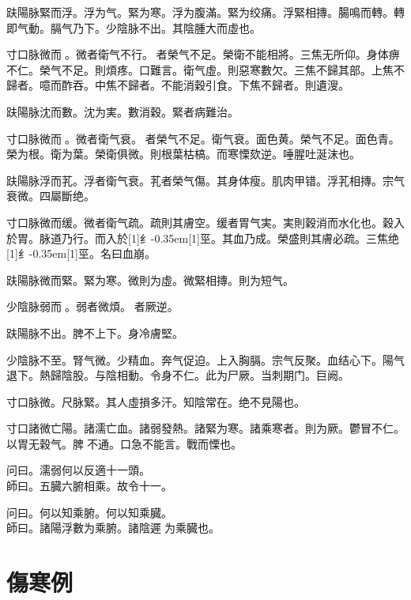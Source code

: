 \documentclass[11pt,oneside,b5paper]{ctexbook}
\begin{document}
\begin{flushleft}
趺陽脉緊而浮。浮为气。緊为寒。浮为腹滿。緊为绞痛。浮緊相摶。腸鳴而轉。轉即气動。膈气乃下。少陰脉不出。其陰腫大而虛也。

寸口脉微而{𬈧}。微者衛气不行。{𬈧}者榮气不足。榮衛不能相將。三焦无所仰。身体痹不仁。榮气不足。則煩疼。口難言。衛气虛。則惡寒數欠。三焦不歸其部。上焦不歸者。噫而酢吞。中焦不歸者。不能消穀引食。下焦不歸者。則遺溲。

趺陽脉沈而數。沈为実。數消穀。緊者病難治。

寸口脉微而{𬈧}。微者衛气衰。{𬈧}者榮气不足。衛气衰。面色黄。榮气不足。面色青。榮为根。衛为葉。榮衛俱微。則根葉枯槁。而寒慄欬逆。唾腥吐涎沫也。

趺陽脉浮而芤。浮者衛气衰。芤者榮气傷。其身体瘦。肌肉甲错。浮芤相摶。宗气衰微。四屬斷绝。

寸口脉微而缓。微者衛气疏。疏則其膚空。缓者胃气実。実則穀消而水化也。穀入於胃。脉道乃行。而入於{\hbox{\scalebox{0.68}[1]{纟}\kern-0.35em\scalebox{0.64}[1]{巠}}}。其血乃成。榮盛則其膚必疏。三焦绝{\hbox{\scalebox{0.68}[1]{纟}\kern-0.35em\scalebox{0.64}[1]{巠}}}。名曰血崩。

趺陽脉微而緊。緊为寒。微則为虛。微緊相摶。則为短气。

少陰脉弱而{𬈧}。弱者微煩。{𬈧}者厥逆。

趺陽脉不出。脾不上下。身冷膚堅。

少陰脉不至。腎气微。少精血。奔气促迫。上入胸膈。宗气反聚。血结心下。陽气退下。熱歸陰股。与陰相動。令身不仁。此为尸厥。当刺期门。巨阙。

寸口脉微。尺脉緊。其人虛損多汗。知陰常在。绝不見陽也。

寸口諸微亡陽。諸濡亡血。諸弱發熱。諸緊为寒。諸乘寒者。則为厥。鬱冒不仁。以胃无穀气。脾{𬈧}不通。口急不能言。戰而慄也。

问曰。濡弱何以反適十一頭。\\
師曰。五臓六腑相乘。故令十一。

问曰。何以知乘腑。何以知乘臓。\\
師曰。諸陽浮數为乘腑。諸陰遲{𬈧}为乘臓也。

\chapter{傷寒例}


\end{flushleft}
\end{document}
